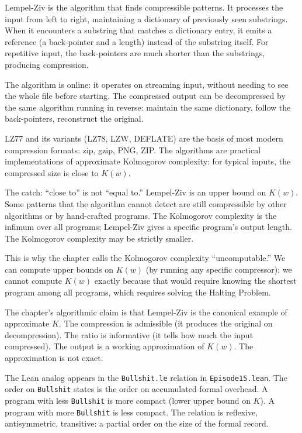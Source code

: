 Lempel-Ziv is the algorithm that finds compressible patterns. It
processes the input from left to right, maintaining a dictionary
of previously seen substrings. When it encounters a substring that
matches a dictionary entry, it emits a reference (a back-pointer
and a length) instead of the substring itself. For repetitive
input, the back-pointers are much shorter than the substrings,
producing compression.

The algorithm is online: it operates on streaming input, without
needing to see the whole file before starting. The compressed
output can be decompressed by the same algorithm running in
reverse: maintain the same dictionary, follow the back-pointers,
reconstruct the original.

LZ77 and its variants (LZ78, LZW, DEFLATE) are the basis of most
modern compression formats: zip, gzip, PNG, ZIP. The algorithms
are practical implementations of approximate Kolmogorov
complexity: for typical inputs, the compressed size is close to
$K(w)$.

The catch: ``close to'' is not ``equal to.'' Lempel-Ziv is an
upper bound on $K(w)$. Some patterns that the algorithm cannot
detect are still compressible by other algorithms or by
hand-crafted programs. The Kolmogorov complexity is the
infimum over all programs; Lempel-Ziv gives a specific
program's output length. The Kolmogorov complexity may be
strictly smaller.

This is why the chapter calls the Kolmogorov complexity
``uncomputable.'' We can compute upper bounds on $K(w)$ (by
running any specific compressor); we cannot compute $K(w)$
exactly because that would require knowing the shortest
program among all programs, which requires solving the
Halting Problem.

The chapter's algorithmic claim is that Lempel-Ziv is the
canonical example of approximate $K$. The compression is
admissible (it produces the original on decompression). The
ratio is informative (it tells how much the input compressed).
The output is a working approximation of $K(w)$. The
approximation is not exact.

The Lean analog appears in the \texttt{Bullshit.le} relation in
\texttt{Episode15.lean}. The order on \texttt{Bullshit} states
is the order on accumulated formal overhead. A program with
less \texttt{Bullshit} is more compact (lower upper bound on
$K$). A program with more \texttt{Bullshit} is less compact.
The relation is reflexive, antisymmetric, transitive: a partial
order on the size of the formal record.

